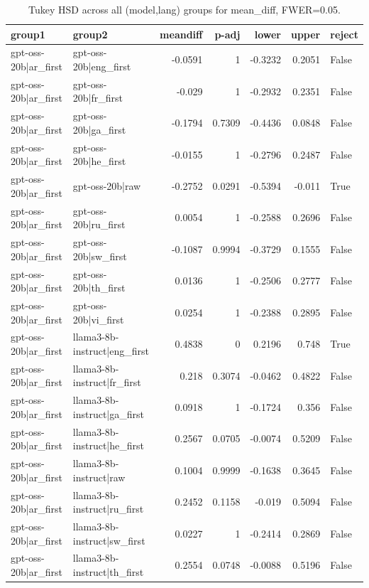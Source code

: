 \begin{table}
\caption{Tukey HSD across all (model,lang) groups for mean_diff, FWER=0.05.}
\label{tab:tukey_all_models_all_langs_mean_diff}
\begin{tabular}{l l r r r r l}
\toprule
group1 & group2 & meandiff & p-adj & lower & upper & reject \\
\midrule
gpt-oss-20b|ar_first & gpt-oss-20b|eng_first & -0.0591 & 1 & -0.3232 & 0.2051 & False \\
gpt-oss-20b|ar_first & gpt-oss-20b|fr_first & -0.029 & 1 & -0.2932 & 0.2351 & False \\
gpt-oss-20b|ar_first & gpt-oss-20b|ga_first & -0.1794 & 0.7309 & -0.4436 & 0.0848 & False \\
gpt-oss-20b|ar_first & gpt-oss-20b|he_first & -0.0155 & 1 & -0.2796 & 0.2487 & False \\
gpt-oss-20b|ar_first & gpt-oss-20b|raw & -0.2752 & 0.0291 & -0.5394 & -0.011 & True \\
gpt-oss-20b|ar_first & gpt-oss-20b|ru_first & 0.0054 & 1 & -0.2588 & 0.2696 & False \\
gpt-oss-20b|ar_first & gpt-oss-20b|sw_first & -0.1087 & 0.9994 & -0.3729 & 0.1555 & False \\
gpt-oss-20b|ar_first & gpt-oss-20b|th_first & 0.0136 & 1 & -0.2506 & 0.2777 & False \\
gpt-oss-20b|ar_first & gpt-oss-20b|vi_first & 0.0254 & 1 & -0.2388 & 0.2895 & False \\
gpt-oss-20b|ar_first & llama3-8b-instruct|eng_first & 0.4838 & 0 & 0.2196 & 0.748 & True \\
gpt-oss-20b|ar_first & llama3-8b-instruct|fr_first & 0.218 & 0.3074 & -0.0462 & 0.4822 & False \\
gpt-oss-20b|ar_first & llama3-8b-instruct|ga_first & 0.0918 & 1 & -0.1724 & 0.356 & False \\
gpt-oss-20b|ar_first & llama3-8b-instruct|he_first & 0.2567 & 0.0705 & -0.0074 & 0.5209 & False \\
gpt-oss-20b|ar_first & llama3-8b-instruct|raw & 0.1004 & 0.9999 & -0.1638 & 0.3645 & False \\
gpt-oss-20b|ar_first & llama3-8b-instruct|ru_first & 0.2452 & 0.1158 & -0.019 & 0.5094 & False \\
gpt-oss-20b|ar_first & llama3-8b-instruct|sw_first & 0.0227 & 1 & -0.2414 & 0.2869 & False \\
gpt-oss-20b|ar_first & llama3-8b-instruct|th_first & 0.2554 & 0.0748 & -0.0088 & 0.5196 & False \\

\end{tabular}
\end{table}
